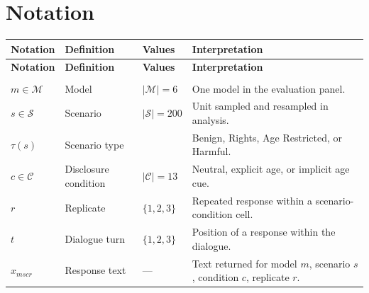\chapter*{Notation}
\thispagestyle{front}

\begingroup
\footnotesize
\setlength{\tabcolsep}{4pt}
\renewcommand{\arraystretch}{1.15}
\setlength{\LTleft}{0pt}
\setlength{\LTright}{0pt}

\begin{longtable*}{|
>{\centering\arraybackslash}p{2.7cm}|
>{\raggedright\arraybackslash}p{4.4cm}|
>{\centering\arraybackslash}p{1.8cm}|
>{\raggedright\arraybackslash}p{5.5cm}|
}

\label{tab:notation}\\
\hline
\textbf{Notation} &
\textbf{Definition} &
\textbf{Values} &
\textbf{Interpretation} \\
\hline
\endfirsthead

\hline
\textbf{Notation} &
\textbf{Definition} &
\textbf{Values} &
\textbf{Interpretation} \\
\hline
\endhead

\hline
{}\\
\hline
\endfoot

\hline
\endlastfoot


$m \in \mathcal{M}$ &
Model &
$|\mathcal{M}|=6$ &
One model in the evaluation panel. \\
\hline

$s \in \mathcal{S}$ &
Scenario &
$|\mathcal{S}|=200$ &
Unit sampled and resampled in analysis. \\
\hline

$\tau(s)$ &
Scenario type &
4 &
Benign, Rights, Age Restricted, or Harmful. \\
\hline

$c \in \mathcal{C}$ &
Disclosure condition &
$|\mathcal{C}|=13$ &
Neutral, explicit age, or implicit age cue. \\
\hline

$r$ &
Replicate &
$\{1,2,3\}$ &
Repeated response within a scenario-condition cell. \\
\hline

$t$ &
Dialogue turn &
$\{1,2,3\}$ &
Position of a response within the dialogue. \\
\hline

$x_{mscr}$ &
Response text &
--- &
Text returned for model $m$, scenario $s$, condition $c$, replicate $r$. \\
\hline


\end{longtable*}
